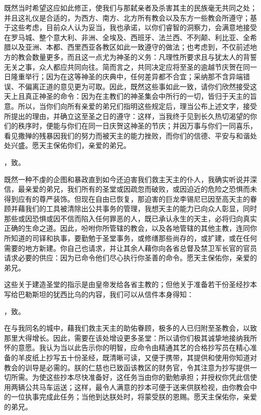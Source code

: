 既然当时希望这应如此修正，使我们与那弑亲者及杀害其主的民族毫无共同之处；并且这礼仪是合适的，为西方、南方、北方所有教会以及东方一些教会所遵守；基于这些考虑，目前众人认为妥当，我也承诺，以你们睿智的洞察力，会满意地接受在罗马城、整个意大利、非洲、全埃及、西班牙、法兰西、不列颠、利比亚、全希腊以及亚洲、本都、西里西亚各教区如此一致遵守的做法；也考虑到，不仅前述地方的教会数量更多，而且这一点尤为神圣的义务：凡理性所要求且与犹太人的背誓无关之事，众人都应共同向往。简而言之，共同决定应将至圣的逾越节庆贺在同一日隆重举行；因为在这等神圣的庆典中，任何差异都不合宜；采纳那不含异端错误、不偏离正道的意见更为可取。因此，既然这些事如此一致，请你们欣然接受这天上且真正神圣的命令：因为在主教们的神圣集会中所行的一切，皆归于天主的旨意。所以，当你们向所有亲爱的弟兄们指明这些规定后，理当公布上述文字，接受所提出的理由，并确立这至圣之日的遵守：这样，当我终于见到长久热切渴望的你们的秩序时，便能与你们在同一日庆贺这神圣的节庆；并因万事与你们一同喜乐，看见撒殚的残暴因我们的努力而被天主的能力挫败，而你们的信德、平安与和谐处处兴盛。愿天主保佑你们，亲爱的弟兄。\par

\par

，致。\par

既然一种不虔的企图和暴政直到如今还迫害我们救主天主的仆人，我确实听说并深信，最亲爱的弟兄，我们所有的圣堂或因疏忽而破败，或因迫近的危险之恐惧而未得到应有的尊严装饰。但现在自由已恢复，那迫害的巨龙李锡尼已因至高天主的眷顾并藉我们的工具被清除出公共事务的管理，我想天主的能力已向众人彰显，同时那些或因恐惧或因不信而陷入任何罪恶的人，既已承认永生的天主，必将归向真实正确的生命之道。因此，吩咐你所管辖的教会，以及各地管辖的其他主教，连同你所知道的司铎和执事，要勤勉于圣堂事务，或修缮那些尚存的，或扩建，或在任何需要的地方新建。你自己也请求，并让其余人藉你向各省总督及禁卫军长官的官员请求必要的供应：因为已命令他们尽心执行你圣善的命令。愿天主保佑你，亲爱的弟兄。\par

这些关于建造圣堂的指示是由皇帝发给各省主教的；但他关于准备若干份圣经抄本写给巴勒斯坦的犹西比乌的内容，我们可以从信件本身得知：\par

，致。\par

在与我同名的城中，藉我们救主天主的助佑眷顾，极多的人已归附至圣教会，以致那里大得增长。因此，需要在该处增设更多圣堂：所以请你们极其诚挚地接纳我所怀的意愿。我认为当以此告示你的明智，应命令由精通其艺的合格抄写员在精心准备的羊皮纸上抄写五十份圣经，既清晰可读，又便于携带，其提供和使用你知道对教会的训导是必需的。朕的仁慈也已致函该教区的财务官，令其注意为抄写提供一切所需。为使这些抄本尽快准备好，这任务当由你的勤勉承担；并授权你凭此信使用两辆公共马车运送；这样，最令人满意的抄本可便于送来供朕检视，由你教会中的一位执事完成此任务；当他到达朕处时，将蒙受朕的恩赐。愿天主保佑你，亲爱的弟兄。\par

